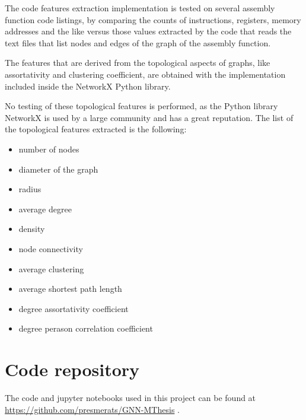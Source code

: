 \begin{appendices}
The code features extraction implementation is tested on several assembly function code listings, by comparing the counts of instructions, registers, memory addresses and the like versus those values extracted by the code that reads the text files that list nodes and edges of the graph of the assembly function.


The features that are derived from the topological aspects of graphs, like assortativity and clustering coefficient, are obtained with the implementation included inside the NetworkX Python library.

No testing of these topological features is performed, as the Python library NetworkX is used by a large community and has a great reputation. 
The list of the topological features extracted is the following:
\begin{itemize}
	\item number of nodes
	\item diameter of the graph
	\item radius
	\item average degree
	\item density
	\item node connectivity
	\item average clustering
	\item average shortest path length
	\item degree assortativity coefficient
	\item degree perason correlation coefficient
\end{itemize}




\section{Code repository}\label{annex:github}

The code and jupyter notebooks used in this project can be found at \href{https://github.com/presmerats/GNN-MThesis}{https://github.com/presmerats/GNN-MThesis} .


\end{appendices} 